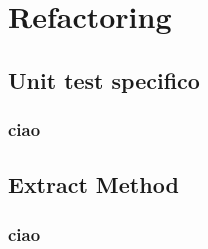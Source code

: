 
\section{Refactoring}

\subsection{Unit test specifico}
\begin{frame}
    \frametitle{ciao}
\end{frame}

\subsection{Extract Method}
\begin{frame}
    \frametitle{ciao}
\end{frame}